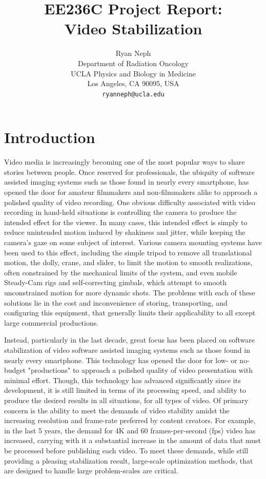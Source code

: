 \documentclass{article} %
\title{EE236C Project Report:\\Video Stabilization}
\author{Ryan Neph \\
Department of Radiation Oncology \\
UCLA Physics and Biology in Medicine \\
Los Angeles, CA 90095, USA \\
\texttt{ryanneph@ucla.edu} \\
}
\begin{document}
\maketitle


\section{Introduction}
Video media is increasingly becoming one of the most popular ways to share stories between people. Once reserved for professionals, the ubiquity of software assisted imaging systems such as those found in nearly every smartphone, has opened the door for amateur filmmakers and non-filmmakers alike to approach a polished quality of video recording. One obvious difficulty associated with video recording in hand-held situations is controlling the camera to produce the intended effect for the viewer. In many cases, this intended effect is simply to reduce unintended motion induced by shakiness and jitter, while keeping the camera's gaze on some subject of interest. Various camera mounting systems have been used to this effect, including the simple tripod to remove all translational motion, the dolly, crane, and slider, to limit the motion to smooth realizations, often constrained by the mechanical limits of the system, and even mobile Steady-Cam rigs and self-correcting gimbals, which attempt to smooth unconstrained motion for more dynamic shots. The problems with each of these solutions lie in the cost and inconvenience of storing, transporting, and configuring this equipment, that generally limits their applicability to all except large commercial productions.

Instead, particularly in the last decade, great focus has been placed on software stabilization of video software assisted imaging systems such as those found in nearly every smartphone. This technology has opened the door for low- or no-budget "productions" to approach a polished quality of video presentation with minimal effort. Though, this technology has advanced significantly since its development, it is still limited in terms of its processing speed, and ability to produce the desired results in all situations, for all types of video. Of primary concern is the ability to meet the demands of video stability amidst the increasing resolution and frame-rate preferred by content creators. For example, in the last 5 years, the demand for 4K and 60 frames-per-second (fps) video has increased, carrying with it a substantial increase in the amount of data that must be processed before publishing each video. To meet these demands, while still providing a pleasing stabilization result, large-scale optimization methods, that are designed to handle large problem-scales are critical.
\end{document}
